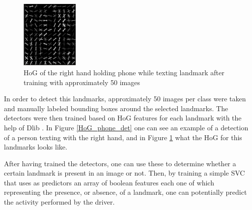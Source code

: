 \documentclass[10pt,twocolumn,letterpaper]{article}
\begin{document}
\begin{figure}[h]
	\centering
		\includegraphics[width=0.25\textwidth]{mult_HOG/HOG_phone}
	\caption{HoG of the right hand holding phone while texting landmark after training with approximately 50 images}
		\label{HoG_phone}
	\end{figure}

In order to detect this landmarks, approximately 50 images per class were taken and manually labeled bounding boxes around the selected landmarks. The detectors were then trained based on HoG features for each landmark with the help of Dlib \cite{dlib09}. In Figure \ref{HoG_phone_det} one can see an example of a detection of a person texting with the right hand, and in Figure \ref{HoG_phone} what the HoG for this landmarks looks like.

After having trained the detectors, one can use these to determine whether a certain landmark is present in an image or not. Then, by training a simple SVC that uses as predictors an array of boolean features each one of which representing the presence, or absence, of a landmark, one can potentially predict the activity performed by the driver.



 





\end{document}
